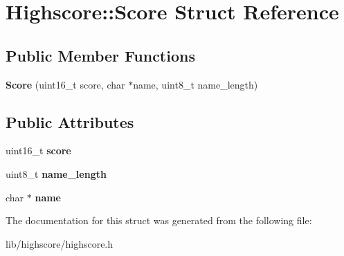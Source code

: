 \hypertarget{struct_highscore_1_1_score}{\section{Highscore\-:\-:Score Struct Reference}
\label{struct_highscore_1_1_score}
}
\subsection*{Public Member Functions}
\begin{DoxyCompactItemize}
\item 
\hypertarget{struct_highscore_1_1_score_a12b53d0585857767f7b672a7ca6d6bcd}{{\bfseries Score} (uint16\-\_\-t score, char $\ast$name, uint8\-\_\-t name\-\_\-length)}\label{struct_highscore_1_1_score_a12b53d0585857767f7b672a7ca6d6bcd}

\end{DoxyCompactItemize}
\subsection*{Public Attributes}
\begin{DoxyCompactItemize}
\item 
\hypertarget{struct_highscore_1_1_score_adb7302dea6fad5c7420f7df730829df6}{uint16\-\_\-t {\bfseries score}}\label{struct_highscore_1_1_score_adb7302dea6fad5c7420f7df730829df6}

\item 
\hypertarget{struct_highscore_1_1_score_a078c44b0290200e5f94d80bf2d21fec1}{uint8\-\_\-t {\bfseries name\-\_\-length}}\label{struct_highscore_1_1_score_a078c44b0290200e5f94d80bf2d21fec1}

\item 
\hypertarget{struct_highscore_1_1_score_aee466300716e218f0ebb6c695a7e52ca}{char $\ast$ {\bfseries name}}\label{struct_highscore_1_1_score_aee466300716e218f0ebb6c695a7e52ca}

\end{DoxyCompactItemize}


The documentation for this struct was generated from the following file\-:\begin{DoxyCompactItemize}
\item 
lib/highscore/highscore.\-h\end{DoxyCompactItemize}
